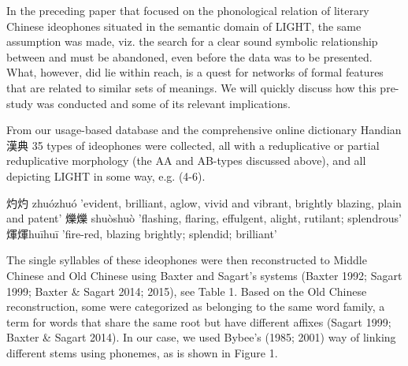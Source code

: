 In the preceding paper that focused on the phonological relation of
literary Chinese ideophones situated in the semantic domain of LIGHT,
the same assumption was made, viz. the search for a clear sound symbolic
relationship between and must be abandoned, even before the data was to
be presented. What, however, did lie within reach, is a quest for
networks of formal features that are related to similar sets of
meanings. We will quickly discuss how this pre-study was conducted and
some of its relevant implications.

From our usage-based database and the comprehensive online dictionary
Handian 漢典 35 types of ideophones were collected, all with a
reduplicative or partial reduplicative morphology (the AA and AB-types
discussed above), and all depicting LIGHT in some way, e.g. (4-6).

\begin{exe}
    \ex 灼灼 zhuózhuó 'evident, brilliant, aglow, vivid and vibrant, brightly blazing, plain and patent'
    \ex 爍爍 shuòshuò 'flashing, flaring, effulgent, alight, rutilant; splendrous' 
    \ex 煇煇huīhuī 'fire-red, blazing brightly; splendid; brilliant'
\end{exe}

The single syllables of these ideophones were then reconstructed to
Middle Chinese and Old Chinese using Baxter and Sagart's systems (Baxter
1992; Sagart 1999; Baxter \& Sagart 2014; 2015), see Table 1. Based on
the Old Chinese reconstruction, some were categorized as belonging to
the same word family, a term for words that share the same root but have
different affixes (Sagart 1999; Baxter \& Sagart 2014). In our case, we
used Bybee's (1985; 2001) way of linking different stems using phonemes,
as is shown in Figure 1.

